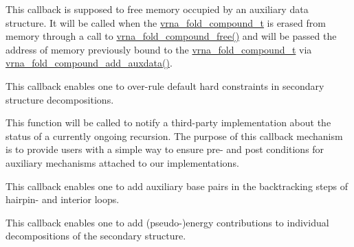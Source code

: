 \begin{DoxyRefList}
\item[\label{callbacks__callbacks000005}%
\Hypertarget{callbacks__callbacks000005}%
Global \hyperlink{group__fold__compound_ga7806651f51b195013839a218b3bbd5a3}{vrna\+\_\+callback\+\_\+free\+\_\+auxdata} (void $\ast$data)]This callback is supposed to free memory occupied by an auxiliary data structure. It will be called when the \hyperlink{group__fold__compound_ga1b0cef17fd40466cef5968eaeeff6166}{vrna\+\_\+fold\+\_\+compound\+\_\+t} is erased from memory through a call to \hyperlink{group__fold__compound_gadded6039d63f5d6509836e20321534ad}{vrna\+\_\+fold\+\_\+compound\+\_\+free()} and will be passed the address of memory previously bound to the \hyperlink{group__fold__compound_ga1b0cef17fd40466cef5968eaeeff6166}{vrna\+\_\+fold\+\_\+compound\+\_\+t} via \hyperlink{group__fold__compound_ga6316a9426bea2f742375e8df6febd3f6}{vrna\+\_\+fold\+\_\+compound\+\_\+add\+\_\+auxdata()}.  
\item[\label{callbacks__callbacks000001}%
\Hypertarget{callbacks__callbacks000001}%
Global \hyperlink{group__hard__constraints_gae465f1d4a3d8b6592b38ecbb0d9f613d}{vrna\+\_\+callback\+\_\+hc\+\_\+evaluate} (int i, int j, int k, int l, unsigned char d, void $\ast$data)]This callback enables one to over-\/rule default hard constraints in secondary structure decompositions.  
\item[\label{callbacks__callbacks000006}%
\Hypertarget{callbacks__callbacks000006}%
Global \hyperlink{group__fold__compound_gac86036fa8cad1108832335063243cdc8}{vrna\+\_\+callback\+\_\+recursion\+\_\+status} (unsigned char status, void $\ast$data)]This function will be called to notify a third-\/party implementation about the status of a currently ongoing recursion. The purpose of this callback mechanism is to provide users with a simple way to ensure pre-\/ and post conditions for auxiliary mechanisms attached to our implementations.  
\item[\label{callbacks__callbacks000004}%
\Hypertarget{callbacks__callbacks000004}%
Global \hyperlink{group__soft__constraints_gaeb6448da6c593d4c489c7fbadcb99499}{vrna\+\_\+callback\+\_\+sc\+\_\+backtrack} (int i, int j, int k, int l, unsigned char d, void $\ast$data)]This callback enables one to add auxiliary base pairs in the backtracking steps of hairpin-\/ and interior loops.  
\item[\label{callbacks__callbacks000002}%
\Hypertarget{callbacks__callbacks000002}%
Global \hyperlink{group__soft__constraints_ga88a266695d9e25cc12114dceb7b4565e}{vrna\+\_\+callback\+\_\+sc\+\_\+energy} (int i, int j, int k, int l, unsigned char d, void $\ast$data)]This callback enables one to add (pseudo-\/)energy contributions to individual decompositions of the secondary structure.  

\end{DoxyRefList}
